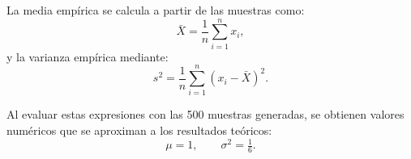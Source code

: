 La media empírica se calcula a partir de las muestras como:
\[
\bar{X} = \frac{1}{n}\sum_{i=1}^{n} x_i,
\]
y la varianza empírica mediante:
\[
s^2 = \frac{1}{n}\sum_{i=1}^{n} (x_i - \bar{X})^2.
\]

Al evaluar estas expresiones con las 500 muestras generadas, se obtienen valores numéricos que se aproximan a los resultados teóricos:
\[
\mu = 1, \qquad \sigma^2 = \tfrac{1}{6}.
\]


